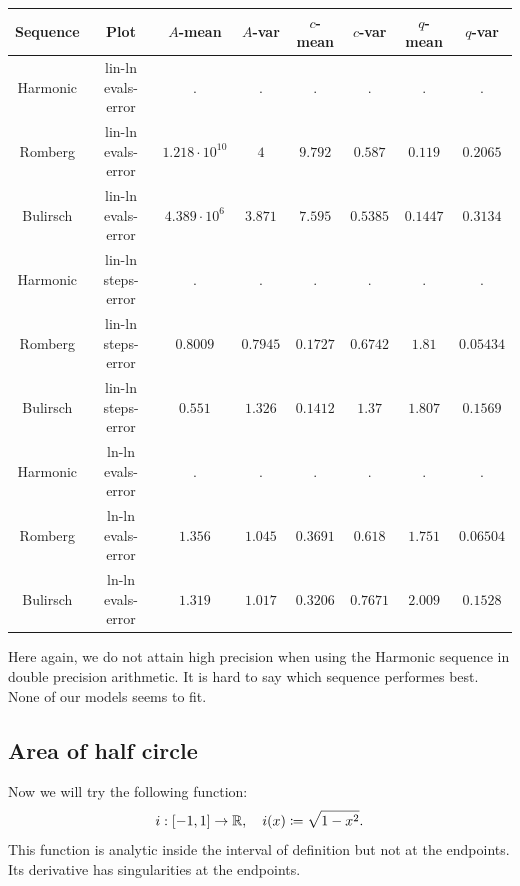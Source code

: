 \begin{table}[H]
    \centering
    \small
    \begin{tabular}{c|c||c|c|c|c|c	|c}
Sequence & Plot & \(A\)-mean & \(A\)-var & \(c\)-mean & \(c\)-var & \(q\)-mean & \(q\)-var\\\hline
Harmonic & lin-ln evals-error & . & . & . & . & . & . \\
Romberg & lin-ln evals-error & \(1.218\cdot 10^{10}\) & \(4\) & \(9.792\) & \(0.587\) & \(0.119\) & \(0.2065\) \\
Bulirsch & lin-ln evals-error & \(4.389\cdot 10^{6}\) & \(3.871\) & \(7.595\) & \(0.5385\) & \(0.1447\) & \(0.3134\) \\
Harmonic & lin-ln steps-error & . & . & . & . & . & . \\
Romberg & lin-ln steps-error & \(0.8009\) & \(0.7945\) & \(0.1727\) & \(0.6742\) & \(1.81\) & \(0.05434\) \\
Bulirsch & lin-ln steps-error & \(0.551\) & \(1.326\) & \(0.1412\) & \(1.37\) & \(1.807\) & \(0.1569\) \\
Harmonic & ln-ln evals-error & . & . & . & . & . & . \\
Romberg & ln-ln evals-error & \(1.356\) & \(1.045\) & \(0.3691\) & \(0.618\) & \(1.751\) & \(0.06504\) \\
Bulirsch & ln-ln evals-error & \(1.319\) & \(1.017\) & \(0.3206\) & \(0.7671\) & \(2.009\) & \(0.1528\) \\
    \end{tabular}
    \label{tab:my_label}
\end{table}

Here again, we do not attain high precision when using the Harmonic sequence in double precision arithmetic. It is hard to say which sequence performes best. None of our models seems to fit.

\subsection{Area of half circle}

Now we will try the following function:
\[
i: [-1, 1] \rightarrow \mathbb{R}, \quad i(x)\coloneqq \sqrt{1-x^2}.
\]
This function is analytic inside the interval of definition but not at the endpoints. Its derivative has singularities at the endpoints.

